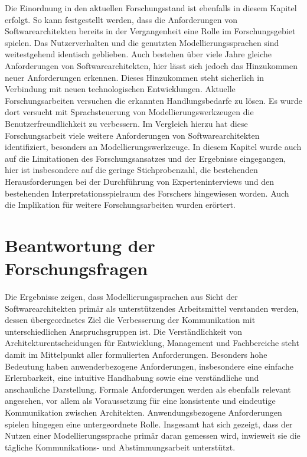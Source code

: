 Die Einordnung in den aktuellen Forschungsstand ist ebenfalls in diesem Kapitel erfolgt. So kann festgestellt werden, dass die Anforderungen von Softwarearchitekten bereits in der Vergangenheit eine Rolle im Forschungsgebiet spielen. Das Nutzerverhalten und die genutzten Modellierungssprachen sind weitestgehend identisch geblieben. Auch bestehen über viele Jahre gleiche Anforderungen von Softwarearchitekten, hier lässt sich jedoch das Hinzukommen neuer Anforderungen erkennen. Dieses Hinzukommen steht sicherlich in Verbindung mit neuen technologischen Entwicklungen. Aktuelle Forschungsarbeiten versuchen die erkannten Handlungsbedarfe zu lösen. Es wurde dort versucht mit Sprachsteuerung von Modellierungswerkzeugen die Benutzerfreundlichkeit zu verbessern. Im Vergleich hierzu hat diese Forschungsarbeit viele weitere Anforderungen von Softwarearchitekten identifiziert, besonders an Modellierungswerkzeuge. 
In diesem Kapitel wurde auch auf die Limitationen des Forschungsansatzes und der Ergebnisse eingegangen, hier ist insbesondere auf die geringe Stichprobenzahl, die bestehenden Herausforderungen bei der Durchführung von Experteninterviews und den bestehenden Interpretationsspielraum des Forschers hingewiesen worden. Auch die Implikation für weitere Forschungsarbeiten wurden erörtert.

\section{Beantwortung der Forschungsfragen}

Die Ergebnisse zeigen, dass Modellierungssprachen aus Sicht der Softwarearchitekten primär als unterstützendes Arbeitsmittel verstanden werden, dessen übergeordnetes Ziel die Verbesserung der Kommunikation mit unterschiedlichen Anspruchsgruppen ist. Die Verständlichkeit von Architekturentscheidungen für Entwicklung, Management und Fachbereiche steht damit im Mittelpunkt aller formulierten Anforderungen.
Besonders hohe Bedeutung haben anwenderbezogene Anforderungen, insbesondere eine einfache Erlernbarkeit, eine intuitive Handhabung sowie eine verständliche und anschauliche Darstellung. Formale Anforderungen werden als ebenfalls relevant angesehen, vor allem als Voraussetzung für eine konsistente und eindeutige Kommunikation zwischen Architekten. Anwendungsbezogene Anforderungen spielen hingegen eine untergeordnete Rolle. Insgesamt hat sich gezeigt, dass der Nutzen einer Modellierungssprache primär daran gemessen wird, inwieweit sie die tägliche Kommunikations- und Abstimmungsarbeit unterstützt.

